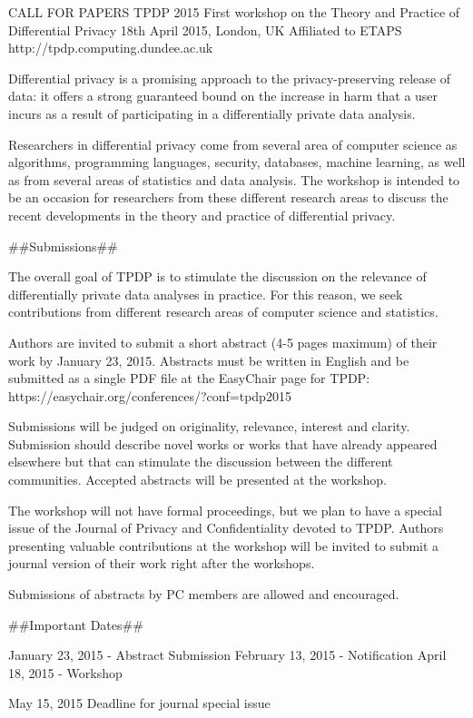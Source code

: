 
CALL FOR PAPERS
TPDP 2015
First workshop on the Theory and Practice of Differential Privacy
18th April 2015, London, UK
Affiliated to ETAPS
http://tpdp.computing.dundee.ac.uk

Differential privacy is a promising approach to the privacy-preserving
release of data: it offers a strong guaranteed bound on the increase
in harm that a user incurs as a result of participating in a
differentially private data analysis. 

Researchers in differential privacy come from several area of computer
science as algorithms, programming languages, security, databases,
machine learning, as well as from several areas of statistics and data
analysis. The workshop is intended to be an occasion for researchers
from these different research areas to discuss the recent developments
in the theory and practice of differential privacy.

##Submissions##

The overall goal of TPDP is to stimulate the discussion on the
relevance of differentially private data analyses in practice. For
this reason, we seek contributions from different research areas of
computer science and statistics.

Authors are invited to submit a short abstract (4-5 pages maximum) of
their work by January 23, 2015. Abstracts must be written in English
and be submitted as a single PDF file at the EasyChair page for TPDP:
https://easychair.org/conferences/?conf=tpdp2015

Submissions will be judged on originality, relevance, interest and
clarity. Submission should describe novel works or works that have
already appeared elsewhere but that can stimulate the discussion
between the different communities. Accepted abstracts will
be presented at the workshop.

The workshop will not have formal proceedings, but we plan to have a
special issue of the Journal of Privacy and Confidentiality devoted to
TPDP. Authors presenting valuable contributions at the workshop will
be invited to submit a journal version of their work right after the
workshops.

Submissions of abstracts by PC members are allowed and encouraged.

##Important Dates##

January 23, 2015 - Abstract Submission
February 13, 2015 - Notification
April 18, 2015 - Workshop

May 15, 2015 Deadline for journal special issue


